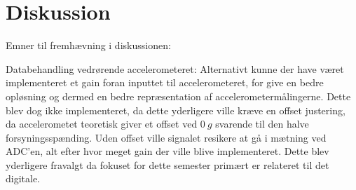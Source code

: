 \chapter{Diskussion}
Emner til fremhævning i diskussionen:


Databehandling vedrørende accelerometeret:
Alternativt kunne der have været implementeret et gain foran inputtet til accelerometeret, for give en bedre opløsning og dermed en bedre repræsentation af accelerometermålingerne. Dette blev dog ikke implementeret, da dette yderligere ville kræve en offset justering, da accelerometet teoretisk giver et offset ved $0~g$ svarende til den halve forsyningsspænding. Uden offset ville signalet resikere at gå i mætning ved ADC'en, alt efter hvor meget gain der ville blive implementeret. Dette blev yderligere fravalgt da fokuset for dette semester primært er relateret til det digitale.   
